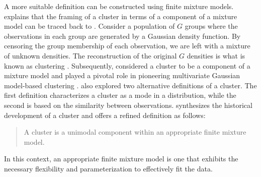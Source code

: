 \documentclass[12pt]{report}
\begin{document}
A more suitable definition can be constructed using finite mixture models. \citet{mcnicholas2016b} explains that the framing of a cluster in terms of a component of a mixture model can be traced back to \citet{tiedeman1955}. Consider a population of $G$ groups where the observations in each group are generated by a Gaussian density function. By censoring the group membership of each observation, we are left with a mixture of unknown densities. The reconstruction of the original $G$ densities is what is known as clustering \citep{tiedeman1955}. Subsequently, \citet{wolfe1963} considered a cluster to be a component of a mixture model and played a pivotal role in pioneering multivariate Gaussian model-based clustering \citep{wolfe1965}. \citet{wolfe1963} also explored two alternative definitions of a cluster. The first definition characterizes a cluster as a mode in a distribution, while the second is based on the similarity between observations. \citet{mcnicholas2016a} synthesizes the historical development of a cluster and offers a refined definition as follows:
\begin{quote}
A cluster is a unimodal component within an appropriate finite mixture model.
\end{quote}
In this context, an appropriate finite mixture model is one that exhibits the necessary flexibility and parameterization to effectively fit the data.




\end{document}

